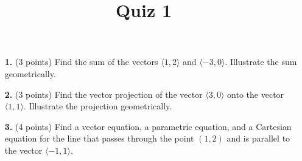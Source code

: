 \documentclass[12pt]{amsart}
\title{Quiz 1}
\begin{document}
\maketitle
\thispagestyle{fancy}

\vskip0.25in
\begin{enumerate}


\item[\textbf{1. }] (3 points) Find the sum of the vectors $\langle 1, 2 \rangle$ and $\langle -3, 0 \rangle$.  Illustrate the sum geometrically.

\vskip 2in

\item[\textbf{2. }](3 points)  Find the vector projection of the vector $\langle 3, 0 \rangle$ onto the vector $\langle 1, 1 \rangle$.  Illustrate the projection geometrically.
 
\vskip 2.5in

\item[\textbf{3. }] (4 points) Find a vector equation, a parametric equation, and a Cartesian equation for the line that passes through
the point $(1,2)$ and is parallel to the vector $\langle -1, 1 \rangle$.




\end{enumerate}
\end{document}
